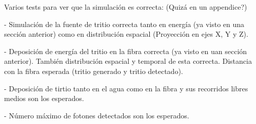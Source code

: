 Varios tests para ver que la simulación es correcta: (Quizá en un appendice?)

- Simulación de la fuente de tritio correcta tanto en energía (ya visto en una sección anterior) como en distribución espacial (Proyección en ejes X, Y y Z).

- Deposición de energía del tritio en la fibra correcta (ya visto en uan sección anterior). También distribución espacial y temporal de esta correcta. Distancia con la fibra esperada (tritio generado y tritio detectado).

- Deposición de tirtio tanto en el agua como en la fibra y sus recorridos libres medios son los esperados.

- Número máximo de fotones detectados son los esperados.